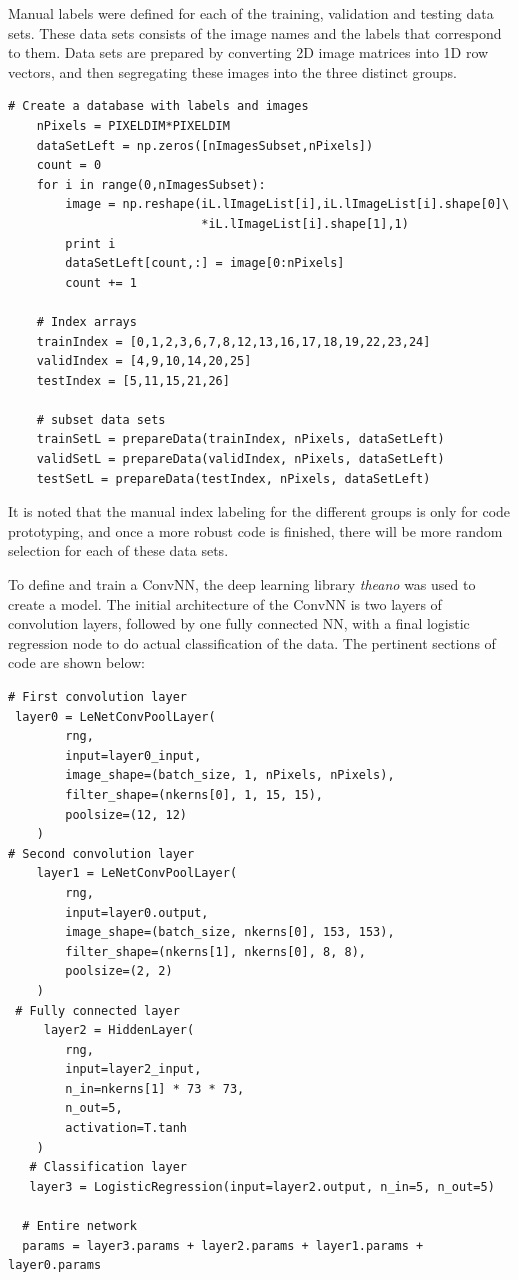 \documentclass[letterpaper,12pt]{article}
\begin{document}
Manual labels were defined for each of the training, validation and testing data sets.  These data sets consists of the image names and the labels that correspond to them. Data sets are prepared by converting 2D image matrices into 1D row vectors, and then segregating these images into the three distinct groups.

\begin{verbatim}
# Create a database with labels and images
    nPixels = PIXELDIM*PIXELDIM
    dataSetLeft = np.zeros([nImagesSubset,nPixels])
    count = 0 
    for i in range(0,nImagesSubset):
        image = np.reshape(iL.lImageList[i],iL.lImageList[i].shape[0]\
                           *iL.lImageList[i].shape[1],1)
        print i
        dataSetLeft[count,:] = image[0:nPixels]
        count += 1
        
    # Index arrays
    trainIndex = [0,1,2,3,6,7,8,12,13,16,17,18,19,22,23,24]
    validIndex = [4,9,10,14,20,25]
    testIndex = [5,11,15,21,26]
    
    # subset data sets
    trainSetL = prepareData(trainIndex, nPixels, dataSetLeft)
    validSetL = prepareData(validIndex, nPixels, dataSetLeft)
    testSetL = prepareData(testIndex, nPixels, dataSetLeft)
\end{verbatim}
It is noted that the manual index labeling for the different groups is only for code prototyping, and once a more robust code is finished, there will be more random selection for each of these data sets.

To define and train a ConvNN, the deep learning library \textit{theano} was used to create a model. The initial architecture of the ConvNN is two layers of convolution layers, followed by one fully connected NN, with a final logistic regression node to do actual classification of the data. The pertinent sections of code are shown below:

\begin{verbatim}
# First convolution layer
 layer0 = LeNetConvPoolLayer(
        rng,
        input=layer0_input,
        image_shape=(batch_size, 1, nPixels, nPixels),
        filter_shape=(nkerns[0], 1, 15, 15),
        poolsize=(12, 12)
    )
# Second convolution layer
    layer1 = LeNetConvPoolLayer(
        rng,
        input=layer0.output,
        image_shape=(batch_size, nkerns[0], 153, 153),
        filter_shape=(nkerns[1], nkerns[0], 8, 8),
        poolsize=(2, 2)
    )
 # Fully connected layer
     layer2 = HiddenLayer(
        rng,
        input=layer2_input,
        n_in=nkerns[1] * 73 * 73,
        n_out=5,
        activation=T.tanh
    )
   # Classification layer
   layer3 = LogisticRegression(input=layer2.output, n_in=5, n_out=5)
   
  # Entire network 
  params = layer3.params + layer2.params + layer1.params + layer0.params
\end{verbatim}
\end{document}
